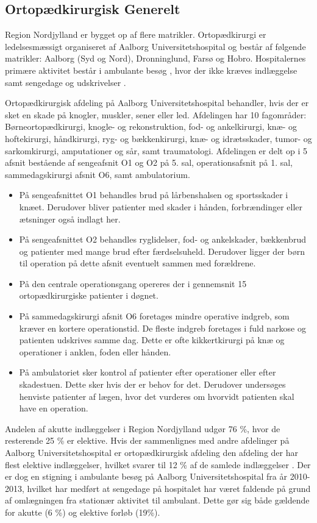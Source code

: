 \subsection{Ortopædkirurgisk Generelt}
Region Nordjylland er bygget op af flere matrikler. Ortopædkirurgi er ledelsesmæssigt organiseret af Aalborg Universitetshospital og består af følgende matrikler: Aalborg (Syd og Nord), Dronninglund, Farsø og Hobro. Hospitalernes primære aktivitet består i ambulante besøg , hvor der ikke kræves indlæggelse samt sengedage  og udskrivelser  \cite{RegionNord2016}. 

Ortopædkirurgisk afdeling på Aalborg Universitetshospital behandler, hvis der er sket en skade  på knogler, muskler, sener eller led. Afdelingen har 10 fagområder: Børneortopædkirurgi, knogle- og rekonstruktion, fod- og ankelkirurgi, knæ- og hoftekirurgi, håndkirurgi, ryg- og bækkenkirurgi, knæ- og idrætsskader, tumor- og sarkomkirurgi, amputationer og sår, samt traumatologi.
Afdelingen er delt op i 5 afsnit bestående af sengeafsnit O1 og O2 på 5. sal, operationsafsnit på 1. sal, sammedagskirurgi afsnit O6, samt ambulatorium.  \cite{Aalborg2016}

\begin{itemize}
\item På sengeafsnittet O1 behandles brud på lårbenshalsen og sportsskader i knæet. Derudover bliver patienter med skader i hånden, forbrændinger eller ætsninger også indlagt her.
\item På sengeafsnittet O2 behandles ryglidelser, fod- og ankelskader, bækkenbrud og patienter med mange brud efter færdselsuheld. Derudover ligger der børn til operation på dette afsnit eventuelt sammen med forældrene. 
\item På den centrale operationsgang opereres der i gennemsnit 15 ortopædkirurgiske patienter i døgnet. 
\item På sammedagskirurgi afsnit O6 foretages mindre operative indgreb, som kræver en kortere operationstid. De fleste indgreb foretages i fuld narkose og patienten udskrives samme dag. Dette er ofte kikkertkirurgi på knæ og operationer i anklen, foden eller hånden. 
\item På ambulatoriet sker kontrol af patienter efter operationer eller efter skadestuen. Dette sker hvis der er behov for det. Derudover undersøges henviste patienter af lægen, hvor det vurderes om hvorvidt patienten skal have en operation. \cite{Aalborg2016}
\end{itemize}


Andelen af akutte indlæggelser i Region Nordjylland udgør 76 \%, hvor de resterende 25 \% er elektive. Hvis der sammenlignes med andre afdelinger på Aalborg Universitetshospital er ortopædkirurgisk afdeling den afdeling der har flest elektive indlæggelser, hvilket svarer til 12 \% af de samlede indlæggelser . Der er dog en stigning i ambulante besøg på Aalborg Universitetshospital fra år 2010-2013, hvilket har medført at sengedage på hospitalet har været faldende på grund af omlægningen fra stationær aktivitet til ambulant. Dette gør sig både gældende for akutte (6 \%) og elektive forløb (19\%).\cite{RegionNord2016} 